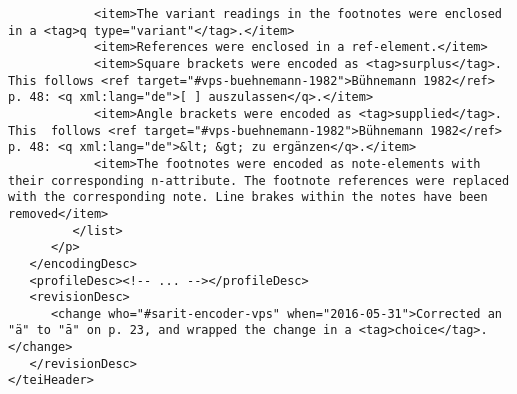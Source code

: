 \documentclass[article,12pt,a4paper]{memoir}%
\begin{document}
\begin{verbatim}
            <item>The variant readings in the footnotes were enclosed in a <tag>q type="variant"</tag>.</item>
            <item>References were enclosed in a ref-element.</item>
            <item>Square brackets were encoded as <tag>surplus</tag>. This follows <ref target="#vps-buehnemann-1982">Bühnemann 1982</ref> p. 48: <q xml:lang="de">[ ] auszulassen</q>.</item>
            <item>Angle brackets were encoded as <tag>supplied</tag>. This 	follows <ref target="#vps-buehnemann-1982">Bühnemann 1982</ref> p. 48: <q xml:lang="de">&lt; &gt; zu ergänzen</q>.</item>
            <item>The footnotes were encoded as note-elements with their corresponding n-attribute. The footnote references were replaced with the corresponding note. Line brakes within the notes have been removed</item>
         </list>
      </p>
   </encodingDesc>
   <profileDesc><!-- ... --></profileDesc>
   <revisionDesc>
      <change who="#sarit-encoder-vps" when="2016-05-31">Corrected an "ä" to "ā" on p. 23, and wrapped the change in a <tag>choice</tag>.</change>
   </revisionDesc>
</teiHeader>
	 \end{verbatim}
       
      \clearpage
      \begin{english}
      \printshorthands
      \printbibliography
      \end{english}
    
\end{document}
